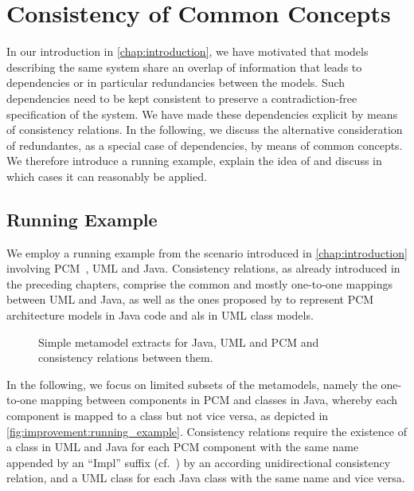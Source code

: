 \section{Consistency of Common Concepts}

In our introduction in \autoref{chap:introduction}, we have motivated that models describing the same system share an overlap of information that leads to dependencies or in particular redundancies between the models.
Such dependencies need to be kept consistent to preserve a contradiction-free specification of the system.
We have made these dependencies explicit by means of consistency relations.
In the following, we discuss the alternative consideration of redundantes, as a special case of dependencies, by means of common concepts.
We therefore introduce a running example, explain the idea of \emph{\commonalities} and discuss in which cases it can reasonably be applied.


\subsection{Running Example}

We employ a running example from the scenario introduced in \autoref{chap:introduction} involving \gls{PCM}~\cite{reussner2016a}, \gls{UML} and Java.
Consistency relations, as already introduced in the preceding chapters, comprise the common and mostly one-to-one mappings between \gls{UML} and Java, as well as the ones proposed by \textcite{langhammer2015a} to represent \gls{PCM} architecture models in Java code and als in \gls{UML} class models.

\begin{figure}
	\centering
	
	\caption[Consistency relations for extracts of Java, UML and PCM]{Simple metamodel extracts for Java, UML and \gls{PCM} and consistency relations between them.}
	\label{fig:improvement:running_example}
\end{figure}

In the following, we focus on limited subsets of the metamodels, namely the one-to-one mapping between components in \gls{PCM} and classes in Java, whereby each component is mapped to a class but not vice versa, as depicted in \autoref{fig:improvement:running_example}.
Consistency relations require the existence of a class in \gls{UML} and Java for each \gls{PCM} component with the same name appended by an \enquote{Impl} suffix (cf.~\cite{langhammer2015a}) by an according unidirectional consistency relation, and a \gls{UML} class for each Java class with the same name and vice versa.


